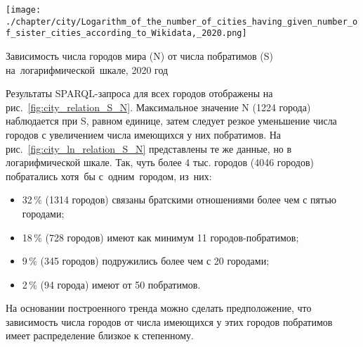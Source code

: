 \begin{marginfigure}[8pt]
\texttt{[image: ./chapter/city/Logarithm\_of\_the\_number\_of\_cities\_having\_given\_number\_of\_sister\_cities\_according\_to\_Wikidata,\_2020.png]}%
    \caption[Зависимость числа городов от числа имеющихся побратимов на логарифмической шкале, 2020 год.]{Зависимость числа городов мира (N) от числа побратимов (S) \mbox{на логарифмической шкале}, 2020 год}%
\label{fig:city_ln_relation_S_N}%
\end{marginfigure}

Результаты SPARQL-запроса для всех городов отображены на рис.~\ref{fig:city_relation_S_N}. 
Максимальное значение N (\num{1224} города) наблюдается при S, равном единице, 
затем следует резкое уменьшение числа городов с увеличением числа имеющихся у них побратимов. 
На рис.~\ref{fig:city_ln_relation_S_N} представлены те же данные, но в логарифмической шкале. 
Так, чуть более 4 тыс. городов (\num{4046} городов) побратались хотя~бы с~одним~городом, из~них:
%
\begin{itemize}
\item 32\,\% (\num{1314} городов) связаны братскими отношениями более чем с пятью городами;
\item 18\,\% (728 городов) имеют как минимум 11 городов-побратимов;
\item 9\,\% (345 городов) подружились более чем с 20 городами;
\item 2\,\% (94 города) имеют от 50 побратимов.
\end{itemize}

На основании построенного тренда можно сделать предположение, 
что зависимость числа городов от числа имеющихся у этих городов побратимов 
имеет распределение близкое к степенному.

%

